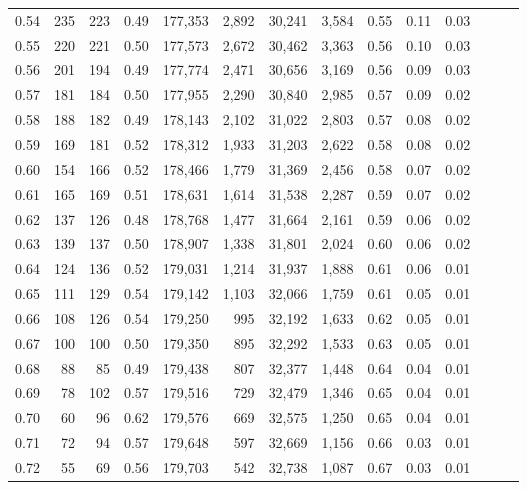 \begin{tabular}{rrrrrrrrrrrrrr}
0.54 &     235 &  223 &  0.49 &  177,353 &    2,892 &  30,241 &   3,584 &  0.55 &  0.11 &      0.03 \\
0.55 &     220 &  221 &  0.50 &  177,573 &    2,672 &  30,462 &   3,363 &  0.56 &  0.10 &      0.03 \\
0.56 &     201 &  194 &  0.49 &  177,774 &    2,471 &  30,656 &   3,169 &  0.56 &  0.09 &      0.03 \\
0.57 &     181 &  184 &  0.50 &  177,955 &    2,290 &  30,840 &   2,985 &  0.57 &  0.09 &      0.02 \\
0.58 &     188 &  182 &  0.49 &  178,143 &    2,102 &  31,022 &   2,803 &  0.57 &  0.08 &      0.02 \\
0.59 &     169 &  181 &  0.52 &  178,312 &    1,933 &  31,203 &   2,622 &  0.58 &  0.08 &      0.02 \\
0.60 &     154 &  166 &  0.52 &  178,466 &    1,779 &  31,369 &   2,456 &  0.58 &  0.07 &      0.02 \\
0.61 &     165 &  169 &  0.51 &  178,631 &    1,614 &  31,538 &   2,287 &  0.59 &  0.07 &      0.02 \\
0.62 &     137 &  126 &  0.48 &  178,768 &    1,477 &  31,664 &   2,161 &  0.59 &  0.06 &      0.02 \\
0.63 &     139 &  137 &  0.50 &  178,907 &    1,338 &  31,801 &   2,024 &  0.60 &  0.06 &      0.02 \\
0.64 &     124 &  136 &  0.52 &  179,031 &    1,214 &  31,937 &   1,888 &  0.61 &  0.06 &      0.01 \\
0.65 &     111 &  129 &  0.54 &  179,142 &    1,103 &  32,066 &   1,759 &  0.61 &  0.05 &      0.01 \\
0.66 &     108 &  126 &  0.54 &  179,250 &      995 &  32,192 &   1,633 &  0.62 &  0.05 &      0.01 \\
0.67 &     100 &  100 &  0.50 &  179,350 &      895 &  32,292 &   1,533 &  0.63 &  0.05 &      0.01 \\
0.68 &      88 &   85 &  0.49 &  179,438 &      807 &  32,377 &   1,448 &  0.64 &  0.04 &      0.01 \\
0.69 &      78 &  102 &  0.57 &  179,516 &      729 &  32,479 &   1,346 &  0.65 &  0.04 &      0.01 \\
0.70 &      60 &   96 &  0.62 &  179,576 &      669 &  32,575 &   1,250 &  0.65 &  0.04 &      0.01 \\
0.71 &      72 &   94 &  0.57 &  179,648 &      597 &  32,669 &   1,156 &  0.66 &  0.03 &      0.01 \\
0.72 &      55 &   69 &  0.56 &  179,703 &      542 &  32,738 &   1,087 &  0.67 &  0.03 &      0.01 \\

\end{tabular}
